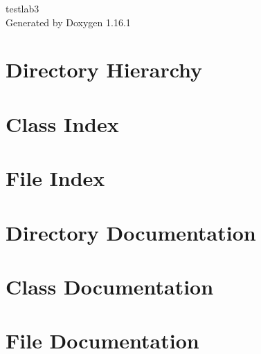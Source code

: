 \documentclass[twoside]{book}
\newcommand{\+}{\discretionary{\mbox{\scriptsize$\hookleftarrow$}}{}{}}
\newcommand{\clearemptydoublepage}{%
    \newpage{\pagestyle{empty}\cleardoublepage}%
  }
\begin{document}
  \raggedbottom
  \begin{titlepage}
  \vspace*{7cm}
  \begin{center}%
  {\Large testlab3}\\
  \vspace*{1cm}
  {\large Generated by Doxygen 1.16.1}\\
  \end{center}
  \end{titlepage}
  \clearemptydoublepage
  \tableofcontents
  \clearemptydoublepage

\chapter{Directory Hierarchy}

\chapter{Class Index}

\chapter{File Index}

\chapter{Directory Documentation}

\chapter{Class Documentation}


\chapter{File Documentation}

  \backmatter
  \newpage
  \clearemptydoublepage
  \printindex
\end{document}

